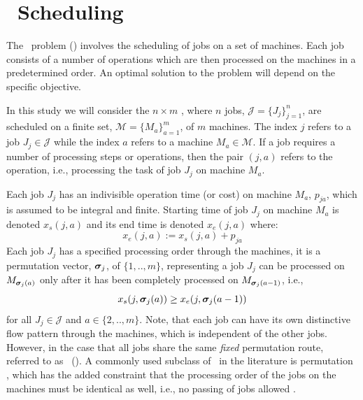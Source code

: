 \documentclass[smallextended]{svjour3}
\begin{document}
	
	\section{\Jsp~Scheduling}\label{sec:problemdef}
	The \jsp~problem (\JSP) involves the scheduling of jobs on a set of 
	machines. Each job consists of a number of operations which are then processed 
	on the machines in a predetermined order. An optimal solution to the problem 
	will depend on the specific objective. 
	
	In this study we will consider the $n\times m$ \JSP, where $n$ jobs, 
	$\mathcal{J}=\{J_j\}_{j=1}^n$, are scheduled on a finite set, 
	$\mathcal{M}=\{M_a\}_{a=1}^m$, of $m$ machines. The index $j$ refers to a job 
	$J_j\in\mathcal{J}$ while the index  $a$ refers to a machine 
	$M_a\in\mathcal{M}$. 
	If a job requires a number of processing steps or operations, then the pair 
	$(j,a)$ refers to the operation, i.e., processing the task of job $J_j$ on 
	machine $M_a$. 
	
	Each job $J_j$ has an indivisible operation time (or cost) on machine $M_a$, 
	$p_{ja}$, which is assumed to be integral and finite. 
	Starting time of job $J_j$ on machine $M_a$ is denoted $x_s(j,a)$ and its 
	end time is denoted $x_e(j,a)$ where: 
	\begin{equation}  x_e(j,a):=x_s(j,a)+p_{ja} \end{equation} 
	Each job $J_j$ has a specified processing order through the machines, it is a 
	permutation vector, $\bm \sigma_j$, of $\{1,..,m\}$, representing a job $J_j$ can 
	be processed on $M_{\bm \sigma_j(a)}$ only after it has been completely processed 
	on $M_{\bm \sigma_j(a-1)}$, i.e.,
	\begin{equation}\label{eq:permutation}
	x_s(j,\bm \sigma_j(a)) \geq x_e(j,\bm \sigma_j(a-1)) 
	\end{equation}
	for all $J_j\in\mathcal{J}$ and $a\in\{2,..,m\}$. 
	Note, that each job can have its own distinctive flow pattern through the 
	machines, which is independent of the other jobs. 
	However, in the case that all jobs share the same \emph{fixed} permutation 
	route, referred to as \fsp~(\FSP). 
	A commonly used subclass of \FSP\ in the literature is permutation \fsp, which 
	has the added constraint that the processing order of the jobs on the machines 
	must be identical as well, i.e., no passing of jobs allowed \cite{Stafford88}.
	
\end{document}
